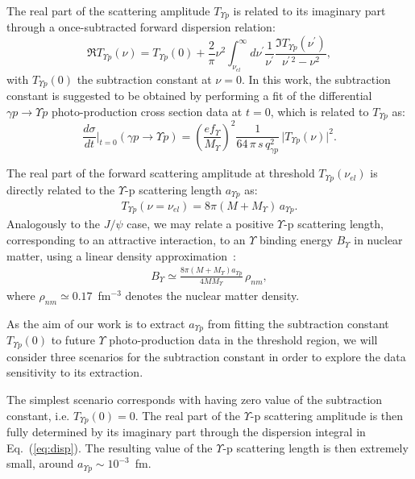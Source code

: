 \documentclass[prd,amsmath,twocolumn,floatfix,amssymb, preprintnumbers, linenumbers,nofootinbib, superscriptaddress]{revtex4}
\newcommand{\beq}{\begin{equation}}
\newcommand{\eeq}{\end{equation}}
\newcommand{\bea}{\begin{eqnarray}}
\newcommand{\eea}{\end{eqnarray}}
\begin{document}
The real part of the scattering amplitude $T_{\Upsilon p}$ is related to its imaginary part
through a once-subtracted forward dispersion relation:
\beq
\Re T_{\Upsilon p}(\nu) = T_{\Upsilon p}(0) + \frac{2}{\pi} \nu^2 \int_{\nu_{el}}^\infty d
\nu^\prime \frac{1}{\nu^\prime} \frac{\Im T_{\Upsilon p}(\nu^\prime)}{\nu^{\prime \, 2} - \nu^2},
\label{eq:disp}
\eeq
with $T_{\Upsilon p}(0) $ the subtraction constant at $\nu = 0$. In this work, the subtraction constant is suggested to be obtained by performing a fit of the 
differential $\gamma p \to \Upsilon p$  photo-production cross section data at $t=0$, which is related to $T_{\Upsilon p}$ as:
\beq
\frac{d \sigma}{dt} \biggr|_{t = 0} (\gamma p \to \Upsilon p) 
= \left( \frac{e f_\Upsilon}{M_\Upsilon} \right)^2  \frac{1}{64 \, \pi \, s \, q_{\gamma p}^2} \, \big| T_{\Upsilon p}(\nu) \big|^2.
\label{eq:dsigmadt0_gapjpsip}
\eeq

The real part of the forward scattering amplitude at threshold $T_{\Upsilon p}(\nu_{el}) $ is directly related to the $\Upsilon$-p scattering length 
$a_{\Upsilon p}$ as:
\bea
T_{\Upsilon p}(\nu = \nu_{el}) = 8 \pi (M + M_\Upsilon) \, a_{\Upsilon p}. 
\eea
Analogously to the $J/\psi$ case, 
we may relate a positive $\Upsilon$-p scattering length, corresponding to an attractive interaction, 
to an $\Upsilon$ binding energy $B_\Upsilon$ in nuclear matter, using a linear density approximation~\cite{Kaidalov:1992hd}:
\begin{eqnarray}
B_\Upsilon \simeq \frac{8 \pi (M + M_\Upsilon) a_{\Upsilon p}}{4 M M_\Upsilon} \, \rho_{nm},
\label{eq:nmbe}
\end{eqnarray}
where $\rho_{nm} \simeq 0.17$~fm$^{-3}$ denotes the nuclear matter density.

As the aim of our work is to extract $a_{\Upsilon p}$ from fitting the subtraction constant $T_{\Upsilon p}(0)$ to future $\Upsilon$ photo-production data in the threshold region, we will consider three scenarios for the subtraction constant in order to explore the data sensitivity to its extraction. 

The simplest scenario corresponds with having zero value of the subtraction constant, i.e. $T_{\Upsilon p}(0) = 0$. The real part of the $\Upsilon$-p  scattering amplitude is then fully determined by its imaginary part through the dispersion integral 
in Eq.~(\ref{eq:disp}). The resulting value of the $\Upsilon$-p scattering length is then extremely small, around $a_{\Upsilon p} \sim 10^{-3}$~fm. 
\end{document}

